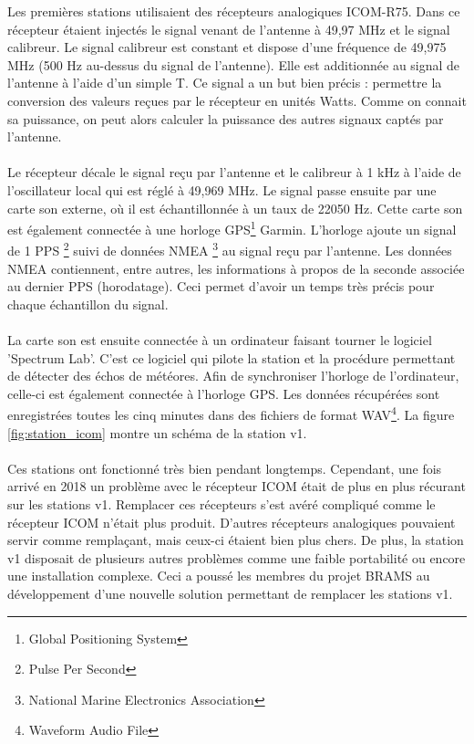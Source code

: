 \documentclass[11pt]{article}
\begin{document}
Les premières stations utilisaient des récepteurs analogiques ICOM-R75.
Dans ce récepteur étaient injectés le signal venant de l'antenne à 49,97 MHz et le signal calibreur.
Le signal calibreur est constant et dispose d'une fréquence de 49,975 MHz (500 Hz au-dessus du signal de l'antenne).
Elle est additionnée au signal de l'antenne à l'aide d'un simple T.
Ce signal a un but bien précis : permettre la conversion des valeurs reçues par le récepteur en unités Watts.
Comme on connait sa puissance, on peut alors calculer la puissance des autres signaux captés par l'antenne.\\
\\
Le récepteur décale le signal reçu par l'antenne et le calibreur à 1 kHz à l'aide de l'oscillateur local qui est réglé à 49,969 MHz.
Le signal passe ensuite par une carte son externe, où il est échantillonnée à un taux de 22050 Hz.
Cette carte son est également connectée à une horloge GPS\footnote{Global Positioning System} Garmin.
L'horloge ajoute un signal de 1 PPS \footnote{Pulse Per Second} suivi de données NMEA \footnote{National Marine Electronics Association} au signal reçu par l'antenne.
Les données NMEA contiennent, entre autres, les informations à propos de la seconde associée au dernier PPS (horodatage).
Ceci permet d'avoir un temps très précis pour chaque échantillon du signal.
\\
\\
La carte son est ensuite connectée à un ordinateur faisant tourner le logiciel 'Spectrum Lab'.
C'est ce logiciel qui pilote la station et la procédure permettant de détecter des échos de météores.
Afin de synchroniser l'horloge de l'ordinateur, celle-ci est également connectée à l'horloge GPS.
Les données récupérées sont enregistrées toutes les cinq minutes dans des fichiers de format WAV\footnote{Waveform Audio File}.
La figure \ref{fig:station_icom} montre un schéma de la station v1.\\
\\
Ces stations ont fonctionné très bien pendant longtemps.
Cependant, une fois arrivé en 2018 un problème avec le récepteur ICOM était de plus en plus récurant sur les stations v1.
Remplacer ces récepteurs s'est avéré compliqué comme le récepteur ICOM n'était plus produit.
D'autres récepteurs analogiques pouvaient servir comme remplaçant, mais ceux-ci étaient bien plus chers.
De plus, la station v1 disposait de plusieurs autres problèmes comme une faible portabilité ou encore une installation complexe.
Ceci a poussé les membres du projet BRAMS au développement d'une nouvelle solution permettant de remplacer les stations v1.
\end{document}
